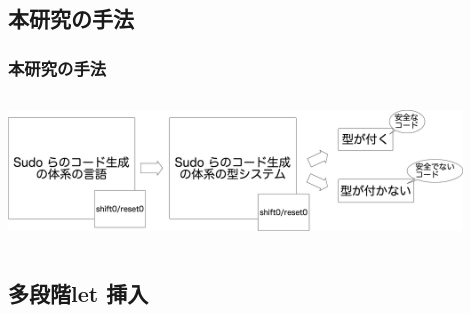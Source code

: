 \documentclass[dvipdfmx,cjk,xcolor=dvipsnames,envcountsect,notheorems,12pt]{beamer}
\newcommand\magenta[1]{\textcolor{magenta}{#1}}
\newcommand\cforin[1]{\underline{\textbf{for}}~{#1}~\underline\textbf{in}}
\theoremstyle{definition}
\begin{document}


\subsection{本研究の手法}
\begin{frame}
  \frametitle{本研究の手法}
  \begin{columns}
    \begin{column}{1.\textwidth}%
      \center
      \includegraphics[clip,height=3.2cm]{./img/code_s0r0.png}
    \end{column}
  \end{columns}
\end{frame}

\subsection{多段階let 挿入}

\end{document}
